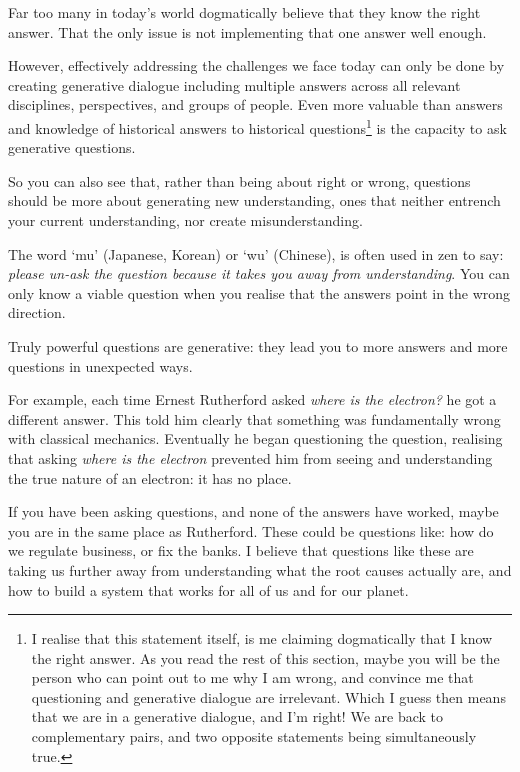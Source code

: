 Far too many in today's world dogmatically believe that they know the right answer. That the only issue is not implementing that one answer well enough. 


However, effectively addressing the challenges we face today can only be done by creating generative dialogue including multiple answers across all relevant disciplines, perspectives, and groups of people. Even more valuable than answers and knowledge of historical answers to historical questions\footnote{I realise that this statement itself, is me claiming dogmatically that I know the right answer. As you read the rest of this section, maybe you will be the person who can point out to me why I am wrong, and convince me that questioning and generative dialogue are irrelevant. Which I guess then means that we are in a generative dialogue, and I'm right! We are back to complementary pairs, and two opposite statements being simultaneously true.} is the capacity to ask generative questions.






So you can also see that, rather than being about right or wrong, questions should be more about generating new understanding, ones that neither entrench your current understanding, nor create misunderstanding.


The word ‘mu’ (Japanese, Korean) or ‘wu’ (Chinese), is often used in zen to say: \emph{please un-ask the question because it takes you away from understanding}. You can only know a viable question when you realise that the answers point in the wrong direction. 


Truly powerful questions are generative: they lead you to more answers and more questions in unexpected ways.


For example, each time Ernest Rutherford asked \emph{where is the electron?} he got a different answer. This told him clearly that something was fundamentally wrong with classical mechanics. Eventually he began questioning the question, realising that asking \emph{where is the electron} prevented him from seeing and understanding the true nature of an electron: it has no place. 


If you have been asking questions, and none of the answers have worked, maybe you are in the same place as Rutherford. These could be questions like: how do we regulate business, or fix the banks. I believe that questions like these are taking us further away from understanding what the root causes actually are, and how to build a system that works for all of us and for our planet.


